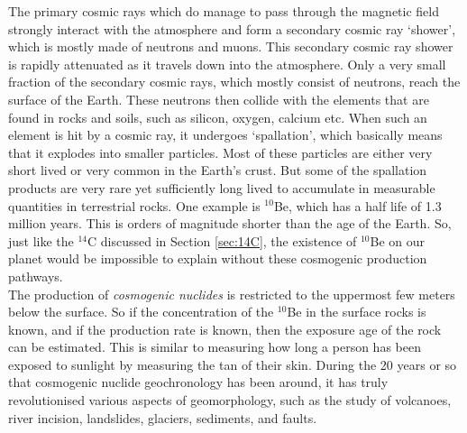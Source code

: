 \documentclass{book}
\begin{document}
The primary cosmic rays which do manage to pass through the magnetic
field strongly interact with the atmosphere and form a secondary
cosmic ray `shower', which is mostly made of neutrons and muons. This
secondary cosmic ray shower is rapidly attenuated as it travels down
into the atmosphere. Only a very small fraction of the secondary
cosmic rays, which mostly consist of neutrons, reach the surface of
the Earth. These neutrons then collide with the elements that are
found in rocks and soils, such as silicon, oxygen, calcium etc. When
such an element is hit by a cosmic ray, it undergoes `spallation',
which basically means that it explodes into smaller particles. Most of
these particles are either very short lived or very common in the
Earth's crust. But some of the spallation products are very rare yet
sufficiently long lived to accumulate in measurable quantities in
terrestrial rocks. One example is $^{10}$Be, which has a half life of
1.3 million years. This is orders of magnitude shorter than the age of
the Earth. So, just like the $^{14}$C discussed in Section
\ref{sec:14C}, the existence of $^{10}$Be on our planet would be
impossible to explain without these cosmogenic production pathways. \\

The production of \emph{cosmogenic nuclides} is restricted to the
uppermost few meters below the surface. So if the concentration of the
$^{10}$Be in the surface rocks is known, and if the production rate is
known, then the exposure age of the rock can be estimated. This is
similar to measuring how long a person has been exposed to sunlight by
measuring the tan of their skin. During the 20 years or so that
cosmogenic nuclide geochronology has been around, it has truly
revolutionised various aspects of geomorphology, such as the study of
volcanoes, river incision, landslides, glaciers, sediments, and
faults.\\
\end{document}
